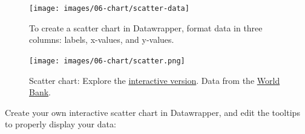 \documentclass[
  english,
]{book}
\begin{document}
\begin{figure}
\texttt{[image: images/06-chart/scatter-data]} \caption{To create a scatter chart in Datawrapper, format data in three columns: labels, x-values, and y-values.}\label{fig:scatter-data}
\end{figure}



\begin{figure}
\centering
\texttt{[image: images/06-chart/scatter.png]}
\caption{\label{fig:scatter}Scatter chart: Explore the \href{https://datawrapper.dwcdn.net/8OQz7/}{interactive version}. Data from the \href{https://docs.google.com/spreadsheets/d/1LJCj3RaVgaQsAZriV_JDQhBrIBSvnH_N1LBCkZK1bqs/}{World Bank}.}
\end{figure}

Create your own interactive scatter chart in Datawrapper, and edit the tooltips to properly display your data:
\end{document}
